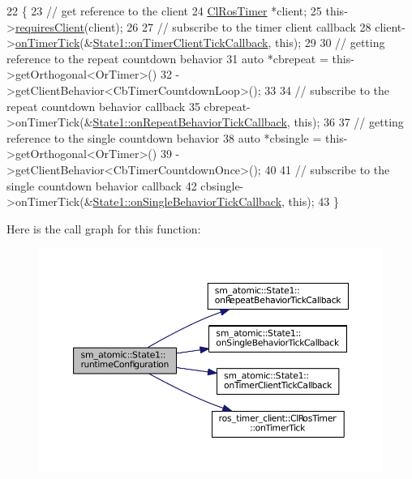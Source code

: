 \begin{DoxyCode}
22     \{
23         \textcolor{comment}{// get reference to the client}
24         \hyperlink{classros__timer__client_1_1ClRosTimer}{ClRosTimer} *client;
25         this->\hyperlink{classsmacc_1_1ISmaccState_a7f95c9f0a6ea2d6f18d1aec0519de4ac}{requiresClient}(client);
26 
27         \textcolor{comment}{// subscribe to the timer client callback}
28         client->\hyperlink{classros__timer__client_1_1ClRosTimer_a06ecf6427b5df59f29879ab3bd1f120c}{onTimerTick}(&\hyperlink{structsm__atomic_1_1State1_adea28f0a0fcedb210a29656f53aeee09}{State1::onTimerClientTickCallback},
       \textcolor{keyword}{this});
29 
30         \textcolor{comment}{// getting reference to the repeat countdown behavior}
31         \textcolor{keyword}{auto} *cbrepeat = this->getOrthogonal<OrTimer>()
32                              ->getClientBehavior<CbTimerCountdownLoop>();
33 
34         \textcolor{comment}{// subscribe to the repeat countdown behavior callback}
35         cbrepeat->onTimerTick(&\hyperlink{structsm__atomic_1_1State1_a9d2c943f02a8e0f1d7b86132ada1c6e0}{State1::onRepeatBehaviorTickCallback}, \textcolor{keyword}{
      this});
36 
37         \textcolor{comment}{// getting reference to the single countdown behavior}
38         \textcolor{keyword}{auto} *cbsingle = this->getOrthogonal<OrTimer>()
39                              ->getClientBehavior<CbTimerCountdownOnce>();
40 
41         \textcolor{comment}{// subscribe to the single countdown behavior callback}
42         cbsingle->onTimerTick(&\hyperlink{structsm__atomic_1_1State1_a9cb95d91cf5a22f0d9d079dc04bf58aa}{State1::onSingleBehaviorTickCallback}, \textcolor{keyword}{
      this});
43     \}
\end{DoxyCode}


Here is the call graph for this function\+:
\nopagebreak
\begin{figure}[H]
\begin{center}
\leavevmode
\includegraphics[width=350pt]{structsm__atomic_1_1State1_afe8195581873c22f5fcc5845a6654f8a_cgraph}
\end{center}
\end{figure}


